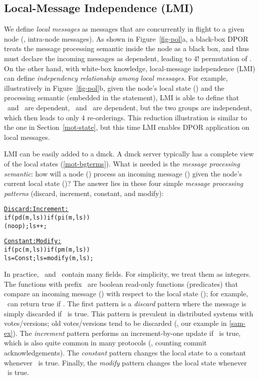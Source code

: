 



\subsection{Local-Message Independence (LMI)}
\label{sam-lmi}





We define {\em local messages} as messages that are concurrently in
flight to a given node (\ie, intra-node messages).  As shown in
Figure~\ref{fig-pol}a, a black-box DPOR treats the message processing
semantic inside the node as a black box, and thus must declare the
incoming messages as dependent, leading to 4! permutation
of \ma\mb\mc\md.  On the other hand, with white-box knowledge,
local-message independence (LMI) can define {\em independency
relationship among local messages}.  For example, illustratively in
Figure~\ref{fig-pol}b, given the node's local state (\ls) and the
processing semantic (embedded in the  statement), LMI is able
to define that \ma\ and \mb\ are dependent, \mc\ and \md\ are
dependent, but the two groups are independent, which then leads to
only 4 re-orderings.  This reduction illustration is similar to the
one in Section~\ref{mot-state}, but this time LMI enables DPOR
application on local messages.


LMI can be easily added to a dmck.  A dmck server typically has a
complete view of the local states (\sec\ref{mot-bgterms}).  What is
needed is the {\em message processing semantic}: how will a node (\nn)
process an incoming message (\mm) given the node's current local state
(\ls)?  The answer lies in these four simple {\em message processing
patterns} (discard, increment, constant, and modify):


{\small
\begin{alltt}
     \underline{Discard:}           \underline{Increment:}  
     if (pd(m,ls))      if (pi(m,ls))
      (noop);             ls++;       

     \underline{Constant:}          \underline{Modify:}  
     if (pc(m,ls))      if (pm(m,ls))
       ls = Const;        ls = modify(m,ls);
\end{alltt}
}

In practice, \ls\ and \mm\ contain many fields.  For simplicity, we
treat them as integers.  The functions with prefix \pp\ are boolean
read-only functions (predicates) that compare an incoming message
(\mm) with respect to the local state (\ls); for example, \pd\ can
return true if .  The first pattern is a {\em discard} pattern
where the message is simply discarded if \pd\ is true.  This pattern
is prevalent in distributed systems with votes/versions; old
votes/versions tend to be discarded (\eg, our example
in \sec\ref{sam-ex}).  The {\em increment} pattern performs an
increment-by-one update if \pi\ is true, which is also quite common in
many protocols (\eg, counting commit acknowledgements).  The {\em
constant} pattern changes the local state to a constant whenever \pc\
is true.  Finally, the {\em modify} pattern changes the local state
whenever \pm\ is true.


